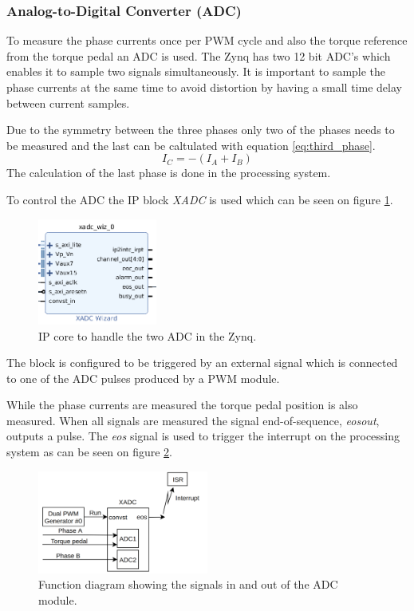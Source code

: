 \subsubsection{Analog-to-Digital Converter (ADC)}

To measure the phase currents once per PWM cycle and also the torque reference from the torque pedal an ADC is used. The Zynq has two 12 bit ADC's which enables it to sample two signals simultaneously. It is important to sample the phase currents at the same time to avoid distortion by having a small time delay between current samples. 

Due to the symmetry between the three phases only two of the phases needs to be measured and the last can be caltulated with equation \ref{eq:third_phase}.
\begin{equation}
    I_C = -(I_A + I_B)
    \label{eq:third_phase}
\end{equation}
The calculation of the last phase is done in the processing system.

To control the ADC the IP block \textit{XADC} is used which can be seen on figure \ref{fig:adc_module}. 

\begin{figure}[H]
	\centering
	\includegraphics[width=0.35\textwidth]{pictures/software/adc.png}
	\caption{IP core to handle the two ADC in the Zynq.}
	\label{fig:adc_module}
\end{figure}

The block is configured to be triggered by an external signal which is connected to one of the ADC pulses produced by a PWM module.

While the phase currents are measured the torque pedal position is also measured. When all signals are measured the signal end-of-sequence, \textit{eos\textunderscore out}, outputs a pulse. The \textit{eos} signal is used to trigger the interrupt on the processing system as can be seen on figure \ref{fig:adc_block_diagram}.

\begin{figure}[H]
	\centering
	\includegraphics[width=0.5\textwidth]{pictures/software/adc_block_diagram.png}
	\caption{Function diagram showing the signals in and out of the ADC module.}
	\label{fig:adc_block_diagram}
\end{figure}



